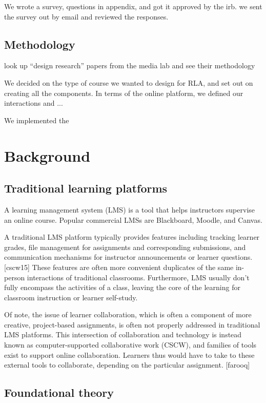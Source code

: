 \documentclass[12pt,twoside,vi]{mitthesis}
\newcommand{\wip}[1]{{\color{red} #1}}
\begin{document}
We wrote a survey, questions in appendix, and got it approved by the irb. we sent the survey out by email and reviewed the responses.


\section{Methodology}

\wip{
look up ``design research'' papers from the media lab and see their methodology

We decided on the type of course we wanted to design for RLA, and set out on creating all the components. In terms of the online platform, we defined our interactions and ...

We implemented the }

\chapter{Background}

\section{Traditional learning platforms}

A learning management system (LMS) is a tool that helps instructors supervise an online course. Popular commercial LMSs are Blackboard, Moodle, and Canvas. 

A traditional LMS platform typically provides features including tracking learner grades, file management for assignments and corresponding submissions, and communication mechanisms for instructor announcements or learner questions. [cscw15] These features are often more convenient duplicates of the same in-person interactions of traditional classrooms. Furthermore, LMS usually don’t fully encompass the activities of a class, leaving the core of the learning for classroom instruction or learner self-study. 

Of note, the issue of learner collaboration, which is often a component of more creative, project-based assignments, is often not properly addressed in traditional LMS platforms. This intersection of collaboration and technology is instead known as computer-supported collaborative work (CSCW), and families of tools exist to support online collaboration. Learners thus would have to take to these external tools to collaborate, depending on the particular assignment. [farooq]

\section{Foundational theory}
\end{document}
